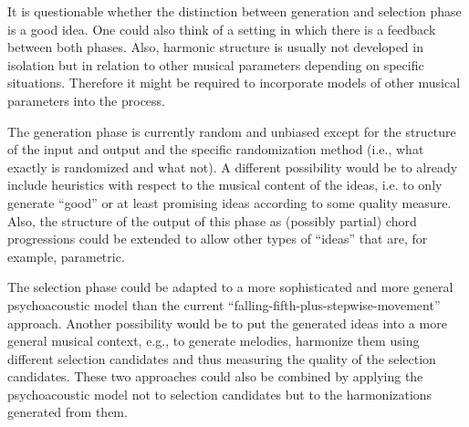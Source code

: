 It is questionable whether the distinction between generation and selection phase is a good idea.
One could also think of a setting in which there is a feedback between both phases.
Also, harmonic structure is usually not developed in isolation but in relation to other musical parameters depending on specific situations.
Therefore it might be required to incorporate models of other musical parameters into the process.

The generation phase is currently random and unbiased except for the structure of the input and output and the specific randomization method (i.e., what exactly is randomized and what not).
A different possibility would be to already include heuristics with respect to the musical content of the ideas, i.e. to only generate ``good'' or at least promising ideas according to some quality measure.
Also, the structure of the output of this phase as (possibly partial) chord progressions could be extended to allow other types of ``ideas'' that are, for example, parametric.

The selection phase could be adapted to a more sophisticated and more general psychoacoustic model than the current ``falling-fifth-plus-stepwise-movement'' approach.
Another possibility would be to put the generated ideas into a more general musical context, e.g., to generate melodies, harmonize them using different selection candidates and thus measuring the quality of the selection candidates.
These two approaches could also be combined by applying the psychoacoustic model not to selection candidates but to the harmonizations generated from them.